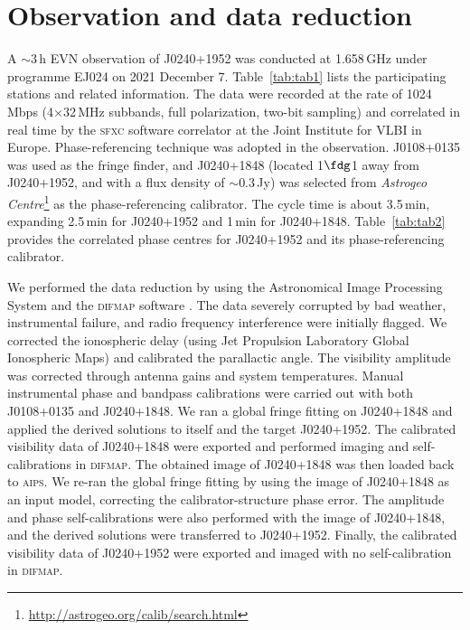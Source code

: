 \documentclass[fleqn,usenatbib]{mnras}
\begin{document}
\section{Observation and data reduction}
\label{sec:section2}

A $\sim3$\,h EVN observation of J0240+1952 was conducted at 1.658\,GHz under programme EJ024 on 2021 December 7. Table~\ref{tab:tab1} lists the participating stations and related information. The data were recorded at the rate of 1024\,Mbps (4$\times$32\,MHz subbands, full polarization, two-bit sampling) and correlated in real time \citep[e-VLBI mode,][]{Szomoru2008} by the \textsc{sfxc} software correlator \citep{Keimpema2015} at the Joint Institute for VLBI in Europe. Phase-referencing technique \citep{Beasley1995} was adopted in the observation. J0108+0135 was used as the fringe finder, and J0240+1848 (located 1$\fdg$1 away from J0240+1952, and with a flux density of $\sim0.3$\,Jy) was selected from \textit{Astrogeo Centre}\footnote{\url{http://astrogeo.org/calib/search.html}} as the phase-referencing calibrator. The cycle time is about 3.5\,min, expanding 2.5\,min for J0240+1952 and 1\,min for J0240+1848. Table~\ref{tab:tab2} provides the correlated phase centres for J0240+1952 and its phase-referencing calibrator.

We performed the data reduction by using the Astronomical Image Processing System \citep[\textsc{aips},][]{Greisen2003} and the \textsc{difmap} software \citep{Shepherd1994}. The data severely corrupted by bad weather, instrumental failure, and radio frequency interference were initially flagged. We corrected the ionospheric delay (using Jet Propulsion Laboratory Global Ionospheric Maps) and calibrated the parallactic angle. The visibility amplitude was corrected through antenna gains and system temperatures. Manual instrumental phase and bandpass calibrations were carried out with both J0108+0135 and J0240+1848. We ran a global fringe fitting on J0240+1848 and applied the derived solutions to itself and the target J0240+1952. The calibrated visibility data of J0240+1848 were exported and performed imaging and self-calibrations in \textsc{difmap}. The obtained image of J0240+1848 was then loaded back to \textsc{aips}. We re-ran the global fringe fitting by using the image of J0240+1848 as an input model, correcting the calibrator-structure phase error. The amplitude and phase self-calibrations were also performed with the image of J0240+1848, and the derived solutions were transferred to J0240+1952. Finally, the calibrated visibility data of J0240+1952 were exported and imaged with no self-calibration in \textsc{difmap}.  
\end{document}
